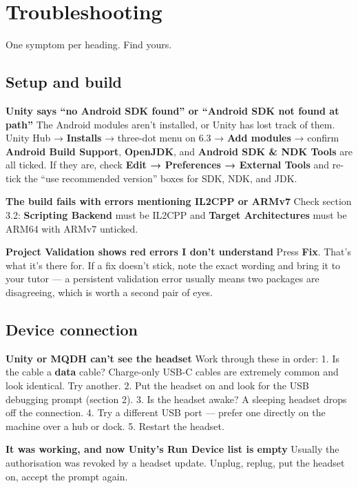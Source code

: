 \documentclass[11pt,a4paper]{article}
\begin{document}
\section{Troubleshooting}\label{troubleshooting}

One symptom per heading. Find yours.

\subsection{Setup and build}\label{setup-and-build}

\textbf{Unity says ``no Android SDK found'' or ``Android SDK not found at path''}
The Android modules aren't installed, or Unity has lost track of them. Unity Hub →
\textbf{Installs} → three-dot menu on 6.3 → \textbf{Add modules} → confirm \textbf{Android Build
Support}, \textbf{OpenJDK}, and \textbf{Android SDK \& NDK Tools} are all ticked. If they are,
check \textbf{Edit → Preferences → External Tools} and re-tick the ``use recommended version''
boxes for SDK, NDK, and JDK.

\textbf{The build fails with errors mentioning IL2CPP or ARMv7}
Check section 3.2: \textbf{Scripting Backend} must be IL2CPP and \textbf{Target Architectures} must
be ARM64 with ARMv7 unticked.

\textbf{Project Validation shows red errors I don't understand}
Press \textbf{Fix}. That's what it's there for. If a fix doesn't stick, note the exact wording
and bring it to your tutor --- a persistent validation error usually means two packages are
disagreeing, which is worth a second pair of eyes.

\subsection{Device connection}\label{device-connection}

\textbf{Unity or MQDH can't see the headset}
Work through these in order:
1. Is the cable a \textbf{data} cable? Charge-only USB-C cables are extremely common and look
identical. Try another.
2. Put the headset on and look for the USB debugging prompt (section 2).
3. Is the headset awake? A sleeping headset drops off the connection.
4. Try a different USB port --- prefer one directly on the machine over a hub or dock.
5. Restart the headset.

\textbf{It was working, and now Unity's Run Device list is empty}
Usually the authorisation was revoked by a headset update. Unplug, replug, put the headset
on, accept the prompt again.
\end{document}

